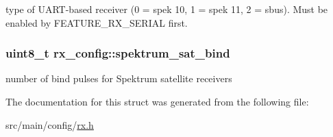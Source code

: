 type of U\+A\+R\+T-\/based receiver (0 = spek 10, 1 = spek 11, 2 = sbus). Must be enabled by F\+E\+A\+T\+U\+R\+E\+\_\+\+R\+X\+\_\+\+S\+E\+R\+I\+A\+L first. 

\hypertarget{structrx__config_a08514dca1ab82db4e499f2e558744388}{
\subsubsection[{spektrum\+\_\+sat\+\_\+bind}]{\setlength{\rightskip}{0pt plus 5cm}uint8\+\_\+t rx\+\_\+config\+::spektrum\+\_\+sat\+\_\+bind}}\label{structrx__config_a08514dca1ab82db4e499f2e558744388}


number of bind pulses for Spektrum satellite receivers 



The documentation for this struct was generated from the following file\+:\begin{DoxyCompactItemize}
\item 
src/main/config/\hyperlink{config_2rx_8h}{rx.\+h}\end{DoxyCompactItemize}
